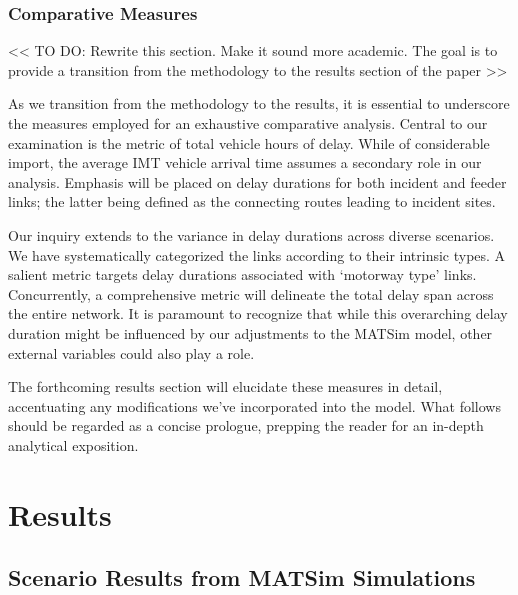\documentclass[
  letterpaper,
  authoryear]{elsarticle}
\begin{document}
\hypertarget{comparative-measures}{%
\subsubsection{Comparative Measures}\label{comparative-measures}}

\textless\textless{} TO DO: Rewrite this section. Make it sound more
academic. The goal is to provide a transition from the methodology to
the results section of the paper \textgreater\textgreater{}

As we transition from the methodology to the results, it is essential to
underscore the measures employed for an exhaustive comparative analysis.
Central to our examination is the metric of total vehicle hours of
delay. While of considerable import, the average IMT vehicle arrival
time assumes a secondary role in our analysis. Emphasis will be placed
on delay durations for both incident and feeder links; the latter being
defined as the connecting routes leading to incident sites.

Our inquiry extends to the variance in delay durations across diverse
scenarios. We have systematically categorized the links according to
their intrinsic types. A salient metric targets delay durations
associated with `motorway type' links. Concurrently, a comprehensive
metric will delineate the total delay span across the entire network. It
is paramount to recognize that while this overarching delay duration
might be influenced by our adjustments to the MATSim model, other
external variables could also play a role.

The forthcoming results section will elucidate these measures in detail,
accentuating any modifications we've incorporated into the model. What
follows should be regarded as a concise prologue, prepping the reader
for an in-depth analytical exposition.


\hypertarget{results}{%
\section{Results}\label{results}}

\hypertarget{scenario-results-from-matsim-simulations}{%
\subsection{Scenario Results from MATSim
Simulations}\label{scenario-results-from-matsim-simulations}}
\end{document}
